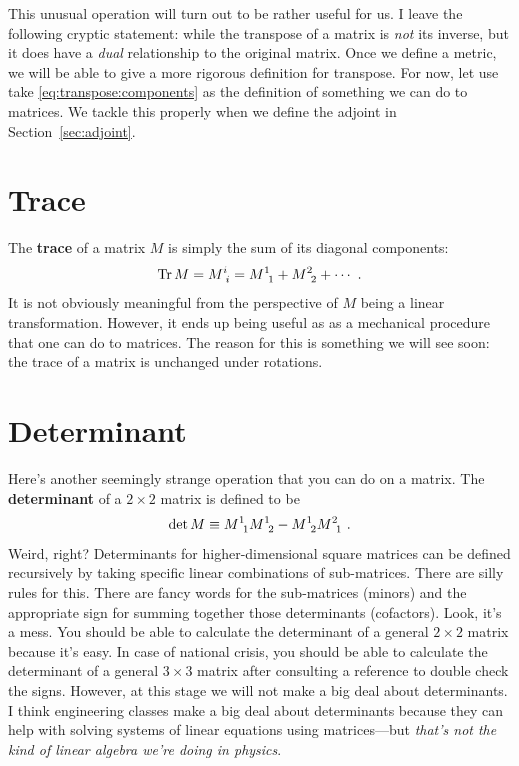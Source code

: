 \begin{subappendices}
This unusual operation will turn out to be rather useful for us. I leave the following cryptic statement: while the transpose of a matrix is \emph{not} its inverse, but it does have a \emph{dual} relationship to the original matrix. Once we define a metric, we will be able to give a more rigorous definition for transpose. For now, let use take \eqref{eq:transpose:components} as the definition of something we can do to matrices. We tackle this properly when we define the adjoint in Section~\ref{sec:adjoint}.


\section{Trace}

The \textbf{trace} of a matrix $M$ is simply the sum of its diagonal components:
\begin{align}
    \Tr M = M\aij{i}{i} = M\aij{1}{1} + M\aij{2}{2} + \cdots \ .
\end{align}
It is not obviously meaningful from the perspective of $M$ being a linear transformation. However, it ends up being useful as as a mechanical procedure that one can do to matrices. The reason for this is something we will see soon: the trace of a matrix is unchanged under rotations. 

\section{Determinant}
\label{sec:determinants:easy}


Here's another seemingly strange operation that you can do on a matrix. The \textbf{determinant} of a $2\times 2$ matrix is defined to be
\begin{align}
    \det M \equiv M\aij11 M\aij12 - M\aij12 M\aij21 \ .
\end{align}
Weird, right? Determinants for higher-dimensional square matrices can be defined recursively by taking specific linear combinations of sub-matrices. There are silly rules for this. There are fancy words for the sub-matrices (minors) and the appropriate sign for summing together those determinants (cofactors). Look, it's a mess. You should be able to calculate the determinant of a general $2\times 2$ matrix because it's easy. In case of national crisis, you should be able to calculate the determinant of a general $3\times 3$ matrix after consulting a reference to double check the signs. However, at this stage we will not make a big deal about determinants. I think engineering classes make a big deal about determinants because they can help with solving systems of linear equations using matrices---but \emph{that's not the kind of linear algebra we're doing in physics}.


\end{subappendices}
